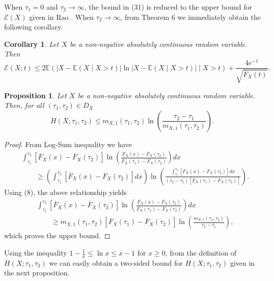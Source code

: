 \documentclass[11pt]{article}
\newtheorem{proposition}{Proposition}
\newtheorem{corollary}{Corollary}
\begin{document}
When $\tau_1=0$ and $\tau_2 \to \infty$, the bound in (31) is reduced to the upper bound for $\mathcal{E}(X)$ given in Rao \cite[Section 6]{Rao2005}. When $\tau_2 \to \infty$, from Theorem 6 we immediately obtain the following corollary.

 
\begin{corollary}
	Let $X$ be a non-negative absolutely continuous random variable. Then
	$$ \textstyle \mathcal{E}(X;t) \leq 2\mathbb{E}(|X - \mathbb{E}(X \mid X > t)| \ln |X - \mathbb{E}(X \mid X > t)| \mid X > t) + \frac{4e^{-1}}{\sqrt{\overline{F}_X(t)}}. $$
\end{corollary}

 
\begin{proposition}
	Let $X$ be a non-negative absolutely continuous random variable. Then, for all $(\tau_1,\tau_2)\in D_X$
	$$ \textstyle H(X;\tau_1,\tau_2) \leq m_{X,1}(\tau_1,\tau_2) \ln\left(\frac{\tau_2 - \tau_1}{m_{X,1}(\tau_1,\tau_2)}\right). $$
\end{proposition}

\begin{proof}
	From Log-Sum inequality we have
	\begin{align*}
		& \textstyle \int_{\tau_1}^{\tau_2} [\overline{F}_X(x) - \overline{F}_X(\tau_2)] \ln\left( \frac{\overline{F}_X(x) - \overline{F}_X(\tau_2)}{\overline{F}_X(\tau_1) - \overline{F}_X(\tau_2)} \right) dx \\
		& \textstyle \qquad \geq \left( \int_{\tau_1}^{\tau_2} [\overline{F}_X(x) - \overline{F}_X(\tau_2)] dx \right) \ln \left( \frac{ \int_{\tau_1}^{\tau_2} [\overline{F}_X(x) - \overline{F}_X(\tau_2)] dx }{ (\tau_2 - \tau_1)[\overline{F}_X(\tau_1) - \overline{F}_X(\tau_2)] } \right).
	\end{align*}
	Using (8), the above relationship yields
	\begin{align*}
		& \textstyle \int_{\tau_1}^{\tau_2} [\overline{F}_X(x) - \overline{F}_X(\tau_2)] \ln\left( \frac{\overline{F}_X(x) - \overline{F}_X(\tau_2)}{\overline{F}_X(\tau_1) - \overline{F}_X(\tau_2)} \right) dx \\ 
		& \textstyle \qquad \geq m_{X,1}(\tau_1,\tau_2)[\overline{F}_X(\tau_1) - \overline{F}_X(\tau_2)] \ln\left( \frac{m_{X,1}(\tau_1,\tau_2)}{\tau_2 - \tau_1} \right),
	\end{align*}
	which proves the upper bound.
\end{proof}

Using the inequality $1 - \frac{1}{x} \leq \ln x \leq x - 1$ for $x \geq 0$, from the definition of $H(X;\tau_1,\tau_2)$ we can easily obtain a two-sided bound for $H(X;\tau_1,\tau_2)$ given in the next proposition.
\end{document}
